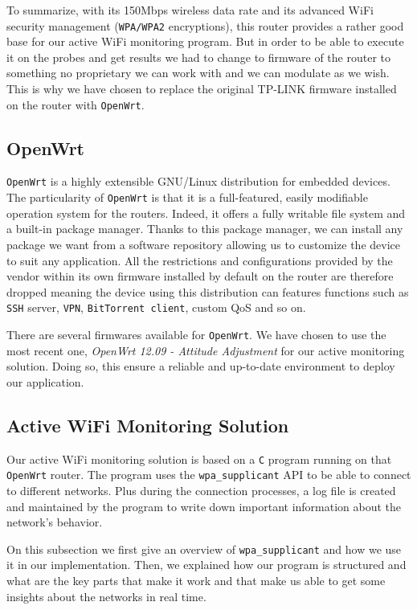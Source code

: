 To summarize, with its 150Mbps wireless data rate and its advanced WiFi security management (\texttt{WPA/WPA2} encryptions), this router provides a rather good base for our active WiFi monitoring program. But in order to be able to execute it on the probes and get results we had to change to firmware of the router to something no proprietary we can work with and we can modulate as we wish. This is why we have chosen to replace the original TP-LINK firmware installed on the router with \texttt{OpenWrt}.


\subsection{OpenWrt}
\texttt{OpenWrt}\cite{openwrt} is a highly extensible GNU/Linux distribution for embedded devices. The particularity of \texttt{OpenWrt} is that it is a full-featured, easily modifiable operation system for the routers. Indeed, it offers a fully writable file system and a built-in package manager. Thanks to this package manager, we can install any package we want from a software repository allowing us to customize the device to suit any application. All the restrictions and configurations provided by the vendor within its own firmware installed by default on the router are therefore dropped meaning the device using this distribution can features functions such as \texttt{SSH} server, \texttt{VPN}, \texttt{BitTorrent client}, custom QoS and so on.

There are several firmwares available for \texttt{OpenWrt}. We have chosen to use the most recent one, \textit{OpenWrt 12.09 - Attitude Adjustment} for our active monitoring solution. Doing so, this ensure a reliable and up-to-date environment to deploy our application.


\subsection{Active WiFi Monitoring Solution}
Our active WiFi monitoring solution is based on a \texttt{C} program running on that \texttt{OpenWrt} router. The program uses the \texttt{wpa\_supplicant} API to be able to connect to different networks. Plus during the connection processes, a log file is created and maintained by the program to write down important information about the network's behavior. 

On this subsection we first give an overview of \texttt{wpa\_supplicant} and how we use it in our implementation. Then, we explained how our program is structured and what are the key parts that make it work and that make us able to get some insights about the networks in real time.

